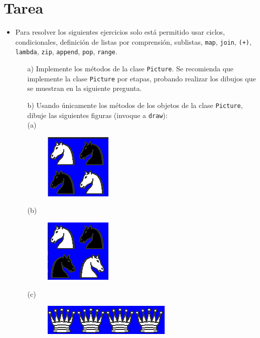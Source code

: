 \documentclass{article}
\begin{document}
	\section{Tarea}
	\begin{itemize}		
		\item Para resolver los siguientes ejercicios solo está permitido usar ciclos, condicionales, definición de listas por comprensión, sublistas, \texttt{map}, \texttt{join}, \texttt{(+)}, \texttt{lambda}, \texttt{zip}, \texttt{append}, \texttt{pop}, \texttt{range}.
		\begin{itemize}[leftmargin=2em]
			\item[a)] Implemente los métodos de la clase \texttt{Picture}. Se recomienda que implemente la clase \texttt{Picture} por etapas, probando realizar los dibujos que se muestran en la siguiente pregunta.
		\end{itemize}
		\begin{itemize}[leftmargin=2em]
			\item[b)] Usando únicamente los métodos de los objetos de la clase \texttt{Picture}, dibuje las siguientes figuras (invoque a \texttt{draw}):
			\\
			
			\subitem(a)
			\begin{figure}[ht]
				\centering
				\includegraphics[scale=2.7]{img/ejercicio_02_a}
				\caption{}
			\end{figure}
			
			
			\subitem(b)
			\begin{figure}[ht]
				\centering
				\includegraphics[scale=2.7]{img/ejercicio_02_b}
				\caption{}
			\end{figure}
			
			\newpage
			\subitem(c)
			\begin{figure}[ht]
				\centering
				\includegraphics[scale=3.5]{img/ejercicio_02_c}
				\caption{}
			\end{figure}
			

\end{itemize}
\end{itemize}
\end{document}
